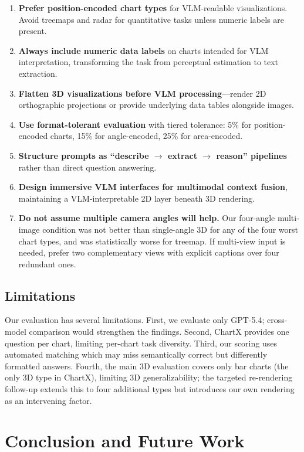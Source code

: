 \documentclass[sigconf, 10pt]{acmart}
\begin{document}
\begin{enumerate}
    \item \textbf{Prefer position-encoded chart types} for VLM-readable visualizations. Avoid treemaps and radar for quantitative tasks unless numeric labels are present.
    \item \textbf{Always include numeric data labels} on charts intended for VLM interpretation, transforming the task from perceptual estimation to text extraction.
    \item \textbf{Flatten 3D visualizations before VLM processing}---render 2D orthographic projections or provide underlying data tables alongside images.
    \item \textbf{Use format-tolerant evaluation} with tiered tolerance: 5\% for position-encoded charts, 15\% for angle-encoded, 25\% for area-encoded.
    \item \textbf{Structure prompts as ``describe $\rightarrow$ extract $\rightarrow$ reason'' pipelines} rather than direct question answering.
    \item \textbf{Design immersive VLM interfaces for multimodal context fusion}, maintaining a VLM-interpretable 2D layer beneath 3D rendering.
    \item \textbf{Do not assume multiple camera angles will help.} Our four-angle multi-image condition was not better than single-angle 3D for any of the four worst chart types, and was statistically worse for treemap. If multi-view input is needed, prefer two complementary views with explicit captions over four redundant ones.
\end{enumerate}

\subsection{Limitations}
Our evaluation has several limitations. First, we evaluate only GPT-5.4; cross-model comparison would strengthen the findings. Second, ChartX provides one question per chart, limiting per-chart task diversity. Third, our scoring uses automated matching which may miss semantically correct but differently formatted answers. Fourth, the main 3D evaluation covers only bar charts (the only 3D type in ChartX), limiting 3D generalizability; the targeted re-rendering follow-up extends this to four additional types but introduces our own rendering as an intervening factor.

\section{Conclusion and Future Work}
\end{document}
